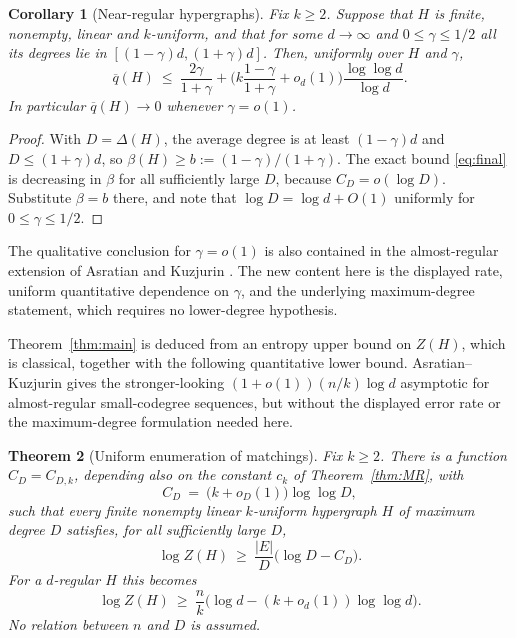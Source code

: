 \documentclass[11pt,a4paper]{amsart}
\theoremstyle{plain}
\newtheorem{theorem}{Theorem}[section]
\newtheorem{corollary}[theorem]{Corollary}
\theoremstyle{definition}
\theoremstyle{remark}
\newcommand{\EE}{E}
\newcommand{\qbar}{\overline{q}}
\newcommand{\Deltaop}{\Delta}
\begin{document}
\begin{corollary}[Near-regular hypergraphs]
\label{cor:nearregular}
Fix $k\ge2$. Suppose that $H$ is finite, nonempty, linear and $k$-uniform, and that for
some $d\to\infty$ and $0\le\gamma\le1/2$ all its degrees lie in
$[(1-\gamma)d,(1+\gamma)d]$. Then, uniformly over $H$ and $\gamma$,
\[
  \qbar(H)\ \le\ \frac{2\gamma}{1+\gamma}
  +\biggl(k\frac{1-\gamma}{1+\gamma}+o_d(1)\biggr)
       \frac{\log\log d}{\log d}.
\]
In particular $\qbar(H)\to0$ whenever $\gamma=o(1)$.
\end{corollary}

\begin{proof}
With $D=\Deltaop(H)$, the average degree is at least $(1-\gamma)d$ and
$D\le(1+\gamma)d$, so $\beta(H)\ge b:=(1-\gamma)/(1+\gamma)$. The exact bound
\eqref{eq:final} is decreasing in $\beta$ for all sufficiently large $D$, because
$C_D=o(\log D)$. Substitute $\beta=b$ there, and note that
$\log D=\log d+O(1)$ uniformly for $0\le\gamma\le1/2$.
\end{proof}

The qualitative conclusion for $\gamma=o(1)$ is also contained in the almost-regular
extension of Asratian and Kuzjurin \cite[\S3]{AsratianKuzjurin}. The new content here is
the displayed rate, uniform quantitative dependence on $\gamma$, and the underlying
maximum-degree statement, which requires no lower-degree hypothesis.

Theorem~\ref{thm:main} is deduced from an entropy upper bound on $Z(H)$, which is
classical, together with the following quantitative lower bound. Asratian--Kuzjurin
\cite[Corollary 1]{AsratianKuzjurin} gives the stronger-looking
$(1+o(1))(n/k)\log d$ asymptotic for almost-regular small-codegree sequences, but without the
displayed error rate or the maximum-degree formulation needed here.

\begin{theorem}[Uniform enumeration of matchings]
\label{thm:engine}
Fix $k\ge2$. There is a function $C_D=C_{D,k}$, depending also on the constant $c_k$ of
Theorem~\ref{thm:MR}, with
\[
  C_D\ =\ \bigl(k+o_D(1)\bigr)\log\log D,
\]
such that every finite nonempty linear $k$-uniform hypergraph $H$ of maximum degree $D$
satisfies, for all sufficiently large $D$,
\[
  \log Z(H)\ \ge\ \frac{|\EE|}{D}\bigl(\log D-C_D\bigr).
\]
For a $d$-regular $H$ this becomes
\[
  \log Z(H)\ \ge\ \frac{n}{k}
  \bigl(\log d-(k+o_d(1))\log\log d\bigr).
\]
No relation between $n$ and $D$ is assumed.
\end{theorem}
\end{document}
